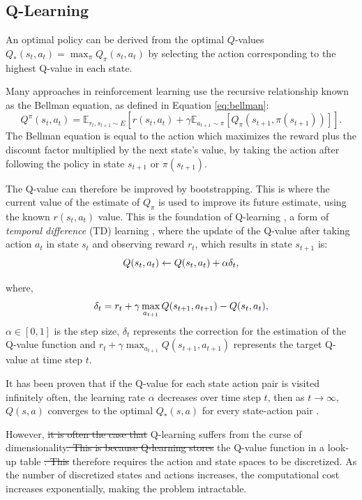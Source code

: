 \documentclass[conference]{IEEEtran}
\providecommand{\DIFadd}[1]{{\protect\color{blue}\uwave{#1}}} %
\providecommand{\DIFdel}[1]{{\protect\color{red}\sout{#1}}}                      %
\providecommand{\DIFaddbegin}{} %
\providecommand{\DIFaddend}{} %
\providecommand{\DIFdelbegin}{} %
\providecommand{\DIFdelend}{} %
\newcommand{\DIFscaledelfig}{0.5}
\newlength{\DIFdelgraphicswidth} %
\newlength{\DIFdelgraphicsheight} %
\newcommand{\DIFaddincludegraphics}[2][]{{\color{blue}\fbox{\DIFOincludegraphics[#1]{#2}}}} %
\newcommand{\DIFdelincludegraphics}[2][]{%
\sbox{\DIFdelgraphicsbox}{\DIFOincludegraphics[#1]{#2}}%
\settoboxwidth{\DIFdelgraphicswidth}{\DIFdelgraphicsbox} %
\settoboxtotalheight{\DIFdelgraphicsheight}{\DIFdelgraphicsbox} %
\scalebox{\DIFscaledelfig}{%
\parbox[b]{\DIFdelgraphicswidth}{\usebox{\DIFdelgraphicsbox}\\[-\baselineskip] \rule{\DIFdelgraphicswidth}{0em}}\llap{\resizebox{\DIFdelgraphicswidth}{\DIFdelgraphicsheight}{%
\setlength{\unitlength}{\DIFdelgraphicswidth}%
\begin{picture}(1,1)%
\thicklines\linethickness{2pt} %
{\color[rgb]{1,0,0}\put(0,0){\framebox(1,1){}}}%
{\color[rgb]{1,0,0}\put(0,0){\line( 1,1){1}}}%
{\color[rgb]{1,0,0}\put(0,1){\line(1,-1){1}}}%
\end{picture}%
}\hspace*{3pt}}} %
} %
\DeclareRobustCommand{\DIFaddbegin}{\DIFOaddbegin \let\includegraphics\DIFaddincludegraphics} %
\DeclareRobustCommand{\DIFaddend}{\DIFOaddend \let\includegraphics\DIFOincludegraphics} %
\DeclareRobustCommand{\DIFdelbegin}{\DIFOdelbegin \let\includegraphics\DIFdelincludegraphics} %
\DeclareRobustCommand{\DIFdelend}{\DIFOaddend \let\includegraphics\DIFOincludegraphics} %
\begin{document}
\subsection{Q-Learning}

 An optimal policy can be derived from the optimal $Q$-values $Q_*(s_t,a_t)=\max_\pi Q_\pi(s_t,a_t)$ by selecting the action corresponding to the highest Q-value in each state.

Many approaches in reinforcement learning use the recursive relationship known as the Bellman equation, as defined in Equation \ref{eq:bellman}:
\begin{dmath}
	\label{eq:bellman}
	Q^\pi(s_t,a_t)=\mathbb{E}_{{r_t},s_{t+1}\sim E} [r(s_t,a_t)+
	\gamma\mathbb{E}_{a_{t+1}\sim \pi}[Q_\pi(s_{t+1},\pi(s_{t+1}))]].
\end{dmath}
\noindent The Bellman equation is equal to the action which maximizes the reward plus the discount factor multiplied by the next state's value, by taking the action after following the policy in state $s_{t+1}$ or $\pi(s_{t+1})$.

The Q-value can therefore be improved by bootstrapping. This is where the current value of the estimate of $Q_\pi$ is used to improve its future estimate, using the known $r(s_t,a_t)$ value. This is the foundation of Q-learning \cite{Gay2007}, a form of \textit{temporal difference} (TD) learning \cite{Sutton2015}, where the update of the Q-value after taking action $a_t$ in state $s_t$ and observing reward $r_t$, which results in state $s_{t+1}$ is:
\begin{equation}
	Q(s_t,a_t)\leftarrow Q(s_t,a_t)+\alpha\delta_t\DIFaddbegin \DIFadd{,
}\DIFaddend \end{equation}
\noindent where,
\begin{equation}
	\delta_t=r_t+\gamma\max_{a_{t+1}}Q(s_{t+1},a_{t+1})-Q(s_{t},a_t)\DIFaddbegin \DIFadd{,
}\DIFaddend \end{equation}
\noindent $\alpha\in [0,1]$ is the step size, $\delta_t$ represents the correction for the estimation of the Q-value function and $r_t+\gamma\max_{a_{t+1}}Q(s_{t+1},a_{t+1})$ represents the target Q-value at time step $t$.	


It has been proven that if the Q-value for each state action pair is visited infinitely often, the learning rate $\alpha$ decreases over time step $t$, then as $t\rightarrow \infty$, $Q(s,a)$ converges to the optimal $Q_*(s,a)$ for every state-action pair \cite{Gay2007}.

However, \DIFdelbegin \DIFdel{it is often the case that }\DIFdelend Q-learning \DIFaddbegin \DIFadd{often }\DIFaddend suffers from the curse of dimensionality\DIFdelbegin \DIFdel{. This is because Q-learning stores }\DIFdelend \DIFaddbegin \DIFadd{, because }\DIFaddend the Q-value function \DIFaddbegin \DIFadd{is stored }\DIFaddend in a look-up table \DIFdelbegin \DIFdel{. This }\DIFdelend \DIFaddbegin \DIFadd{which }\DIFaddend therefore requires the action and state spaces to be discretized. As the number of discretized states and actions increases, the computational cost increases exponentially, making the problem intractable. 
\DIFaddbegin 
\end{document}
